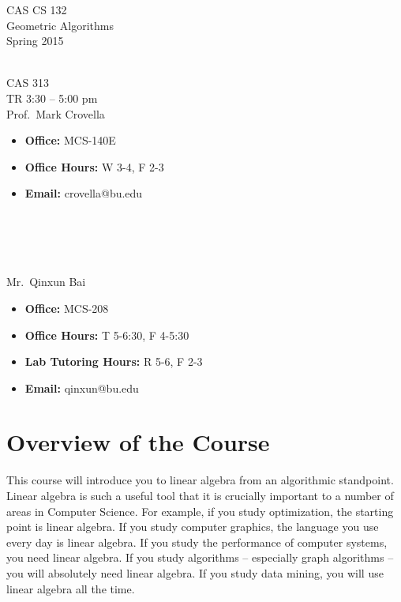 \documentclass[11pt]{article}
\begin{document}
\sloppy 
\begin{center}
\LARGE CAS CS 132\\
\Large Geometric Algorithms\\
\Large\rm Spring 2015\\~\\
\end{center}

 CAS 313\\[\baselineskip]
 TR 3:30 -- 5:00 pm 
\\[\baselineskip] 

 Prof.\ Mark Crovella\\[0.75\baselineskip]
\begin{minipage}[t]{0.60\textwidth}
\begin{itemize}
\item {\bf Office:} MCS-140E
\item {\bf Office Hours:} {\small W 3-4,  F 2-3}
\item {\bf Email:} crovella@bu.edu
\end{itemize}
\end{minipage}
~\\~\\~\\~\\
  Mr.\ Qinxun Bai\\[0.75\baselineskip]
 \begin{minipage}[t]{0.60\textwidth}
 \begin{itemize}
 \item {\bf Office:} MCS-208
 \item {\bf Office Hours:} {\small T 5-6:30, F 4-5:30}
 \item {\bf Lab Tutoring Hours:} {\small R 5-6, F 2-3}
 \item {\bf Email:} qinxun@bu.edu
 \end{itemize}
 \end{minipage}

\section*{Overview of the Course}

This course will introduce you to linear algebra from an algorithmic
standpoint.  Linear algebra is such a useful tool that it is crucially
important to a number of areas in Computer Science. For example, if you study
optimization, the starting point is linear algebra. If you study
computer graphics, the language you use every day is linear algebra. If
you study the performance of computer systems, you need linear
algebra. If you study algorithms -- especially graph algorithms -- you
will absolutely need linear algebra. If you study data mining, you will
use linear algebra all the time. 
\end{document}
